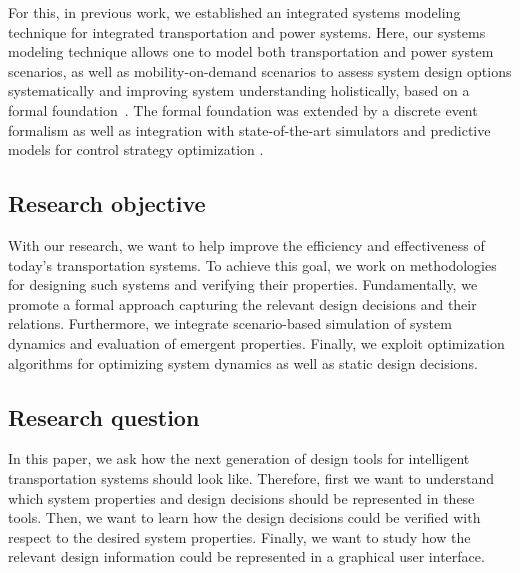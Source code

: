 \documentclass[10pt,twocolumn]{article}
\begin{document}

%

For this, in previous work, we established an integrated systems modeling technique for integrated transportation and power systems. Here, our systems modeling technique allows one to model both transportation and power system scenarios, as well as mobility-on-demand scenarios to assess system design options systematically and improving system understanding holistically, based on a formal foundation~\cite{ascher_hackenberg_2014,ascher_hackenberg_2015,ascher_hackenberg_2016,ascher_hackenberg_2017}. The formal foundation was extended by a discrete event formalism \cite{ascher2023discrete} as well as integration with state-of-the-art simulators and predictive models for control strategy optimization \cite{ascher_hackenberg_albayrak_2023}.


\subsection{Research objective}

With our research, we want to help improve the efficiency and effectiveness of today's transportation systems.
To achieve this goal, we work on methodologies for designing such systems and verifying their properties.
Fundamentally, we promote a formal approach capturing the relevant design decisions and their relations.
Furthermore, we integrate scenario-based simulation of system dynamics and evaluation of emergent properties.
Finally, we exploit optimization algorithms for optimizing system dynamics as well as static design decisions.

\subsection{Research question}

In this paper, we ask how the next generation of design tools for intelligent transportation systems should look like.
Therefore, first we want to understand which system properties and design decisions should be represented in these tools.
Then, we want to learn how the design decisions could be verified with respect to the desired system properties.
Finally, we want to study how the relevant design information could be represented in a graphical user interface.
\end{document}

